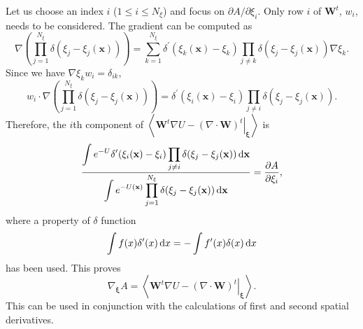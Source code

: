Let us choose an index $i$ ($1\leq i\leq N_\xi$) and focus on $\partial A/\partial \xi_i$. Only row $i$ of $\mathbf{W}^t$, $w_i$, needs to be considered. The gradient can be computed as
\begin{equation}
    \nabla\left(\prod_{j=1}^{N_\xi}\delta(\xi_j-\xi_j(\mathbf{x}))\right)=\sum_{k=1}^{N_\xi}\delta^\prime(\xi_k(\mathbf{x})-\xi_k)\prod_{j\neq k}\delta(\xi_j-\xi_j(\mathbf{x}))\nabla \xi_k.
\end{equation}
Since we have $\nabla \xi_k w_i=\delta_{ik}$,
\begin{equation}
    w_i\cdot \nabla\left(\prod_{j=1}^{N_\xi}\delta(\xi_j-\xi_j(\mathbf{x}))\right)=\delta^\prime(\xi_i(\mathbf{x})-\xi_i)\prod_{j\neq i}\delta(\xi_j-\xi_j(\mathbf{x})).
\end{equation}
Therefore, the $i$th component of $\left<\left.\mathbf{W}^t\nabla U-(\nabla\cdot\mathbf{W})^t\right|_{\boldsymbol{\xi}}\right>$ is
\begin{equation}
    \frac{\displaystyle\int e^{-U}\delta^\prime(\xi_i(\mathbf{x})-\xi_i)\prod\limits_{j\neq i}\delta(\xi_j-\xi_j(\mathbf{x}))\mathop{}\!\mathrm{d} \mathbf{x}}{\displaystyle\int e^{-U(\mathbf{x})}\prod\limits_{j=1}^{N_\xi}\delta(\xi_j-\xi_j(\mathbf{x}))\mathop{}\!\mathrm{d} \mathbf{x}}=\frac{\partial A}{\partial \xi_i},
\end{equation}
where a property of $\delta$ function
\begin{equation}
   \int f(x)\delta^\prime(x)\mathop{}\!\mathrm{d} x=-\int f^\prime(x)\delta(x)\mathop{}\!\mathrm{d} x
\end{equation}
has been used. This proves
\begin{equation}
    \nabla_{\boldsymbol{\xi}}A=\left<\left.\mathbf{W}^t\nabla U-(\nabla\cdot\mathbf{W})^t\right|_{\boldsymbol{\xi}}\right>.
    \label{eq:FEM:ABF:ABFold}
\end{equation}
This can be used in conjunction with the calculations of first and second spatial derivatives. 

